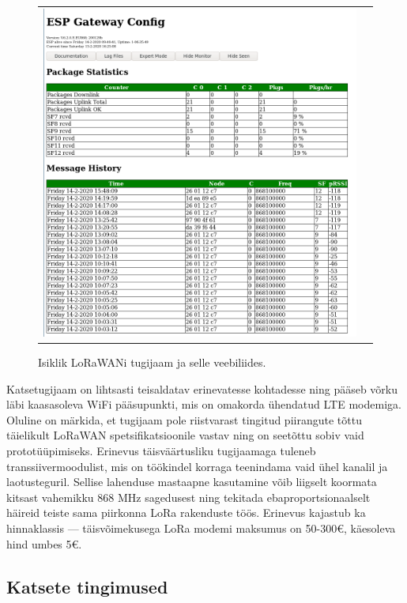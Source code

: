\documentclass[12pt]{article}
\begin{document}
\begin{figure} [htbp]
\begin{tabular}{c c}
\begin{minipage}{0.53\textwidth}
            \includegraphics[width=\textwidth]{figures/ttn-jaama-liides.png}
        \end{minipage}
    \end{tabular}
    \caption{Isiklik LoRaWANi tugijaam ja selle veebiliides.}
    \label{fig:omatugijaam}
\end{figure}

Katsetugijaam on lihtsasti teisaldatav erinevatesse kohtadesse ning pääseb võrku läbi kaasasoleva WiFi pääsupunkti, mis on omakorda ühendatud LTE modemiga.
Oluline on märkida, et tugijaam pole riistvarast tingitud piirangute tõttu täielikult LoRaWAN spetsifikatsioonile vastav ning on seetõttu sobiv vaid prototüüpimiseks.
Erinevus täisväärtusliku tugijaamaga tuleneb transsiivermoodulist, mis on töökindel korraga teenindama vaid ühel kanalil ja laotusteguril.
Sellise lahenduse mastaapne kasutamine võib liigselt koormata kitsast vahemikku 868 MHz sagedusest ning tekitada ebaproportsionaalselt häireid teiste sama piirkonna LoRa rakenduste töös.
Erinevus kajastub ka hinnaklassis — täisvõimekusega LoRa modemi maksumus on 50-300€, käesoleva hind umbes 5€.

\subsection{Katsete tingimused}
\end{document}
